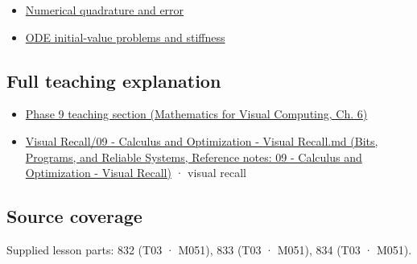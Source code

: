 \begin{itemize}
\tightlist
\item
  \hyperref[appendix-80521eae6b71]{Numerical quadrature and error}
\item
  \hyperref[appendix-e8ab9836882e]{ODE initial-value problems and stiffness}
\end{itemize}

\subsection{Full teaching explanation}\label{appendix-1a50e72435c2-full-teaching-explanation}

\begin{itemize}
\tightlist
\item
  \href{../02-Mathematics-for-Visual-Computing/main.pdf\#nameddest=02-foundations-ii-ch022-integration-and-quadrature}{Phase 9 teaching section (Mathematics for Visual Computing, Ch. 6)}
\item
  \href{../01-Bits-Programs-and-Reliable-Systems/main.pdf\#nameddest=appendix-adf48f5dc5c1}{Visual Recall/09 - Calculus and Optimization - Visual Recall.md (Bits, Programs, and Reliable Systems, Reference notes: 09 - Calculus and Optimization - Visual Recall)} · visual recall
\end{itemize}

\subsection{Source coverage}\label{appendix-1a50e72435c2-source-coverage}

Supplied lesson parts: 832 (T03 · M051), 833 (T03 · M051), 834 (T03 · M051).
